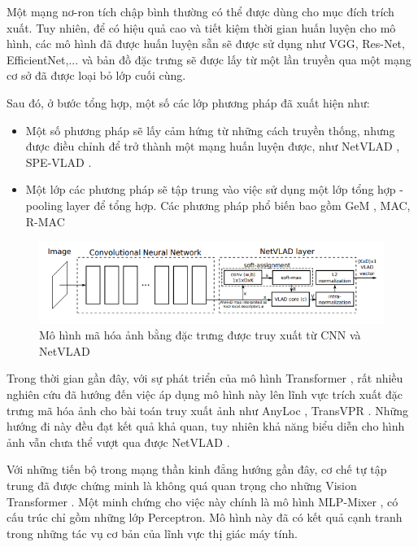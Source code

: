 Một mạng nơ-ron tích chập bình thường có thể được dùng cho mục đích trích xuất. Tuy nhiên, để có hiệu quả cao và tiết kiệm thời gian huấn luyện cho mô hình, các mô hình đã được huấn luyện sẵn sẽ được sử dụng như VGG, Res-Net, EfficientNet,... và bản đồ đặc trưng sẽ được lấy từ một lần truyền qua một mạng cơ sở đã được loại bỏ lớp cuối cùng.

Sau đó, ở bước tổng hợp, một số các lớp phương pháp đã xuất hiện như:
\begin{itemize}
    \item Một số phương pháp sẽ lấy cảm hứng từ những cách truyền thống, nhưng được điều chỉnh để trở thành một mạng huấn luyện được, như NetVLAD \cite{arandjelovic2016netvlad}, SPE-VLAD \cite{yu2019spatial}.
    \item Một lớp các phương pháp sẽ tập trung vào việc sử dụng một lớp tổng hợp - pooling layer để tổng hợp. Các phương pháp phổ biến bao gồm GeM \cite{radenovic2018fine}, MAC, R-MAC \cite{tolias2015particular}
\end{itemize}

\begin{figure}[H]
    \centering
    \includegraphics[scale=0.8]{pics/Chapter3/netvlad.png}
    \caption{Mô hình mã hóa ảnh bằng đặc trưng được truy xuất từ CNN và  NetVLAD \cite{arandjelovic2016netvlad}}
    \label{fig:enter-label}
\end{figure}

Trong thời gian gần đây, với sự phát triển của mô hình Transformer \cite{vaswani2023attention}, rất nhiều nghiên cứu đã hướng đến việc áp dụng mô hình này lên lĩnh vực trích xuất đặc trưng mã hóa ảnh cho bài toán truy xuất ảnh như AnyLoc \cite{keetha2023anyloc}, TransVPR \cite{wang2022transvpr}. Những hướng đi này đều đạt kết quả khả quan, tuy nhiên khả năng biểu diễn cho hình ảnh vẫn chưa thể vượt qua được NetVLAD \cite{alibey2023mixvpr}.

Với những tiến bộ trong mạng thần kinh đẳng hướng gần đây, cơ chế tự tập trung đã được chứng minh là không quá quan trọng cho những Vision Transformer \cite{dosovitskiy2021image}. Một minh chứng cho việc này chính là mô hình MLP-Mixer \cite{tolstikhin2021mlpmixer}, có cấu trúc chỉ gồm những lớp Perceptron. Mô hình này đã có kết quả cạnh tranh trong những tác vụ cơ bản của lĩnh vực thị giác máy tính.

